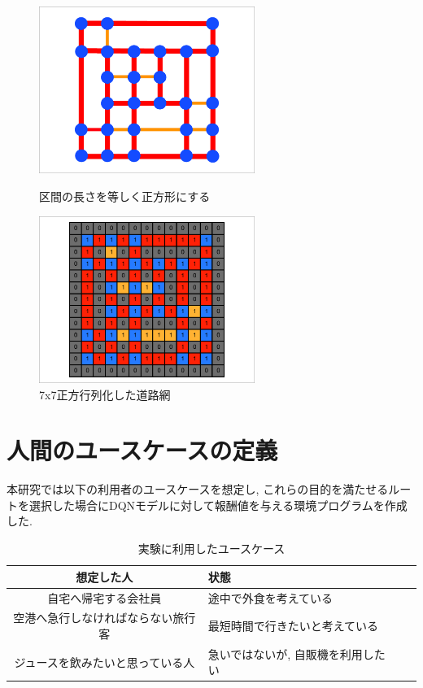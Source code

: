 \begin{figure}[htbp]
    \begin{minipage}{0.5\hsize}
        \begin{center}
            \includegraphics[width=70mm]{assets/MAP_5.eps}
        \end{center}
        \caption{区間の長さを等しく正方形にする}
        \label{rs:5}
    \end{minipage}
    \begin{minipage}{0.5\hsize}
        \begin{center}
            \includegraphics[width=70mm]{assets/MAP_6.eps}
        \end{center}
        \caption{7x7正方行列化した道路網}
        \label{rs:6}
    \end{minipage}
\end{figure}


\section{人間のユースケースの定義}

本研究では以下の利用者のユースケースを想定し, これらの目的を満たせるルートを選択した場合にDQNモデルに対して報酬値を与える環境プログラムを作成した.

\begin{table}[h]
    \caption{実験に利用したユースケース}
    \label{table:SpeedOfLight}
    \centering
    \begin{tabular}{clll}
      \hline
        想定した人 & 状態 \\
        \hline \hline
        自宅へ帰宅する会社員 & 途中で外食を考えている \\
        空港へ急行しなければならない旅行客 & 最短時間で行きたいと考えている \\
        ジュースを飲みたいと思っている人 & 急いではないが, 自販機を利用したい \\
      \hline
    \end{tabular}
  \end{table}
  



